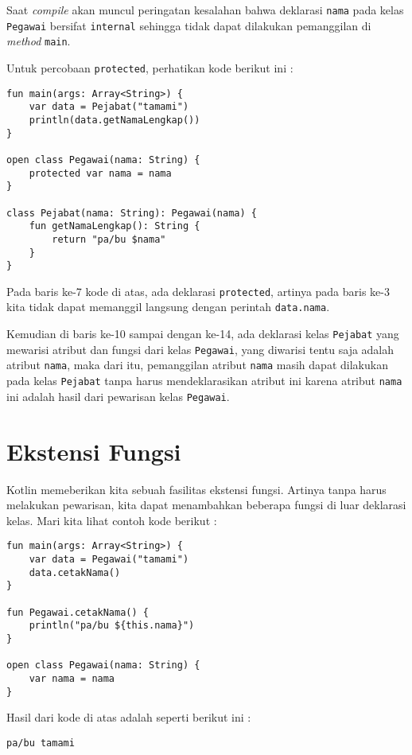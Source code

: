 Saat \textit{compile} akan muncul peringatan kesalahan bahwa deklarasi \texttt{nama} pada kelas \texttt{Pegawai} bersifat \texttt{internal} sehingga tidak dapat dilakukan pemanggilan di \textit{method} \texttt{main}.

Untuk percobaan \texttt{protected}, perhatikan kode berikut ini :

\begin{lstlisting}
fun main(args: Array<String>) {
	var data = Pejabat("tamami")
	println(data.getNamaLengkap())
}

open class Pegawai(nama: String) {
	protected var nama = nama
}

class Pejabat(nama: String): Pegawai(nama) {
	fun getNamaLengkap(): String {
		return "pa/bu $nama"
	}
}
\end{lstlisting}

Pada baris ke-7 kode di atas, ada deklarasi \texttt{protected}, artinya pada baris ke-3 kita tidak dapat memanggil langsung dengan perintah \texttt{data.nama}. 

Kemudian di baris ke-10 sampai dengan ke-14, ada deklarasi kelas \texttt{Pejabat} yang mewarisi atribut dan fungsi dari kelas \texttt{Pegawai}, yang diwarisi tentu saja adalah atribut \texttt{nama}, maka dari itu, pemanggilan atribut \texttt{nama} masih dapat dilakukan pada kelas \texttt{Pejabat} tanpa harus mendeklarasikan atribut ini karena atribut \texttt{nama} ini adalah hasil dari pewarisan kelas \texttt{Pegawai}.

\section{Ekstensi Fungsi}

Kotlin memeberikan kita sebuah fasilitas ekstensi fungsi. Artinya tanpa harus melakukan pewarisan, kita dapat menambahkan beberapa fungsi di luar deklarasi kelas. Mari kita lihat contoh kode berikut :

\begin{lstlisting}
fun main(args: Array<String>) {
	var data = Pegawai("tamami")
	data.cetakNama()
}

fun Pegawai.cetakNama() {
	println("pa/bu ${this.nama}")
}

open class Pegawai(nama: String) {
	var nama = nama
}
\end{lstlisting}

Hasil dari kode di atas adalah seperti berikut ini :

\begin{lstlisting}
pa/bu tamami
\end{lstlisting}

